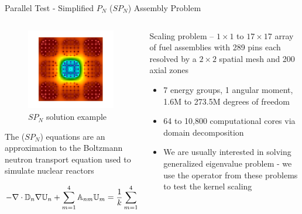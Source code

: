 \documentclass{beamer}
\begin{document}

\begin{frame}{Parallel Test - Simplified $P_N$ ($SP_N$) Assembly Problem}
\small
\begin{columns}

    \begin{column}{0.55\textwidth}

      \vspace{-0.2in}
      \begin{figure}
        \centering
        \includegraphics[width=2.0in]{../siam_cse_2015/presentation/prob4}
        \vspace{-0.2in}
        \caption{$SP_N$ solution example}
      \end{figure}

      \vspace{-0.1in}

      The ($SP_N$) equations are an approximation to the Boltzmann neutron
      transport equation used to simulate nuclear reactors

      \vspace{-0.2in}

      \[
        \small
        -\nabla \cdot \mathbb{D}_n \nabla \mathbb{U}_n + \sum_{m=1}^4
        \mathbb{A}_{nm} \mathbb{U}_m = \frac{1}{k} \sum_{m=1}^4
        \mathbb{F}_{nm} \mathbb{U}_m
      \]

    \end{column}

    \begin{column}{0.45\textwidth}
      Scaling problem -- $1 \times 1$ to $17 \times 17$ array of fuel
      assemblies with 289 pins each resolved by a $2 \times 2$ spatial mesh
      and 200 axial zones

      \vfill

      \begin{itemize}
      \item 7 energy groups, 1 angular moment, 1.6M to 273.5M degrees of
        freedom
      \item 64 to 10,800 computational cores via domain decomposition
      \item We are usually interested in solving generalized eigenvalue
        problem - we use the operator from these problems to test the kernel
        scaling
      \end{itemize}
    \end{column}

  \end{columns}

\end{frame}
\end{document}
